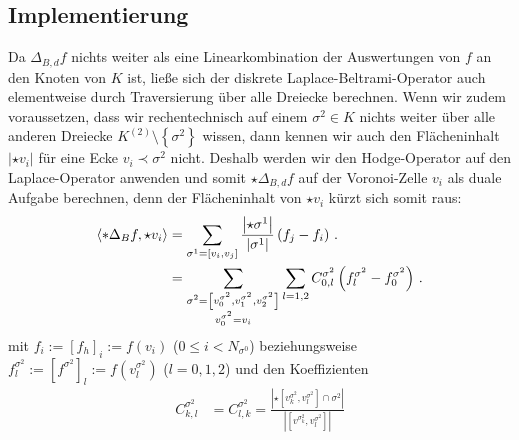   \subsection{Implementierung}
    \label{subsecLaplaceImplementierung}
    Da \( \Delta_{B,d} f \) nichts weiter als eine Linearkombination der Auswertungen von \( f \) an den
    Knoten von \( K \) ist, ließe sich der diskrete Laplace-Beltrami-Operator auch elementweise durch
    Traversierung über alle Dreiecke berechnen.
    Wenn wir zudem voraussetzen, dass wir rechentechnisch auf einem \( \sigma^{2}\in K \) nichts weiter
    über alle anderen Dreiecke \mbox{\( K^{(2)}\setminus\left\{ \sigma^{2} \right\} \)} wissen, 
    dann kennen wir auch den Flächeninhalt \( \left| \star v_{i} \right| \) für eine Ecke 
    \( v_{i}\prec\sigma^{2} \) nicht.
    Deshalb werden wir den Hodge-Operator auf den Laplace-Operator anwenden und somit \( \star\Delta_{B,d} f \)
    auf der Voronoi-Zelle \( v_{i} \) als duale Aufgabe berechnen, 
    denn der Flächeninhalt von \( \star v_{i} \) kürzt sich
    somit raus:
    \begin{align}
      \left\langle *\Delta_{B} f , \star v_{i} \right\rangle
          &= \sum_{\sigma^{1}=\left[ v_{i}, v_{j} \right]} 
                       \frac{\left| \star\sigma^{1} \right|}{\left| \sigma^{1} \right|}
                       \left( f_{j} - f_{i} \right) \,\text{.} \\
          &= \sum_{\substack{\sigma^{2}=\left[ v^{\sigma^{2}}_{0},v^{\sigma^{2}}_{1},v^{\sigma^{2}}_{2} \right]\\
                                               v^{\sigma^{2}}_{0} = v_{i}}}
                  \sum_{l=1,2} C^{\sigma^{2}}_{0,l} 
                          \left( f^{\sigma^{2}}_{l} -  f^{\sigma^{2}}_{0}\right) \,\text{.}
          \label{eqLaplaceElementSummanden}
    \end{align}
    mit \( f_{i} := \left[ f_{h} \right]_{i} := f(v_{i}) \) (\( 0 \le i < N_{\sigma^{0}} \)) 
    beziehungsweise 
    \mbox{\( f^{\sigma^{2}}_{l} := \left[ f^{\sigma^{2}} \right]_{l}:=f(v^{\sigma^{2}}_{l})\)}
    \mbox{(\( l=0,1,2 \))}
    und den Koeffizienten
    \begin{align}
      C^{\sigma^{2}}_{k,l} &= C^{\sigma^{2}}_{l,k}
                            = \frac{\left| \star \left[ v^{\sigma^{2}}_{k}, v^{\sigma^{2}}_{l} \right] 
                                            \cap \sigma^{2}\right|}
                                   {\left| \left[ v^{\sigma^{2}_{k}}, v^{\sigma^{2}}_{l} \right] \right|}
    \end{align}
